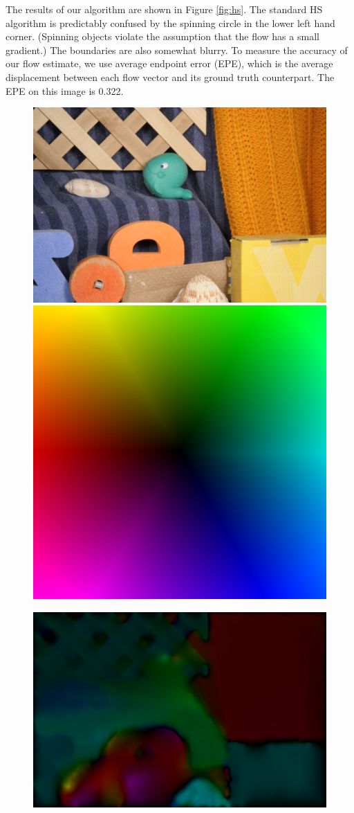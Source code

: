 \documentclass[10pt,twocolumn,letterpaper]{article}
\begin{document}
The results of our algorithm are shown in Figure \ref{fig:hs}.  The standard HS algorithm is predictably confused by the spinning circle in the lower left hand corner.  (Spinning objects violate the assumption that the flow has a small gradient.)  The boundaries are also somewhat blurry.  To measure the accuracy of our flow estimate, we use average endpoint error (EPE), which is the average displacement between each flow vector and its ground truth counterpart.  The EPE on this image is 0.322.

\begin{figure}

\includegraphics[width=0.6 \columnwidth] {frame10.png} 
\includegraphics[width=0.39 \columnwidth] {flow-color-key.png}

\includegraphics[width=\columnwidth]{10iter.png}


\end{figure}
\end{document}
